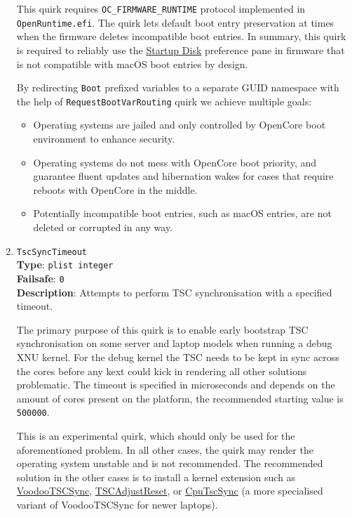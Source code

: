 \documentclass[]{article}
\providecommand{\tightlist}{%
  \setlength{\itemsep}{0pt}\setlength{\parskip}{0pt}}
\begin{document}
\begin{enumerate}
  This quirk requires \texttt{OC\_FIRMWARE\_RUNTIME} protocol implemented
  in \texttt{OpenRuntime.efi}. The quirk lets default boot entry
  preservation at times when the firmware deletes incompatible boot entries.
  In summary, this quirk is required to reliably
  use the \href{https://support.apple.com/HT202796}{Startup Disk} preference
  pane in firmware that is not compatible with macOS boot entries by design.

  By redirecting \texttt{Boot} prefixed variables to a separate GUID namespace
  with the help of \texttt{RequestBootVarRouting} quirk we achieve multiple goals:
  \begin{itemize}
  \tightlist
  \item Operating systems are jailed and only controlled by OpenCore boot
  environment to enhance security.
  \item Operating systems do not mess with OpenCore boot priority, and guarantee
  fluent updates and hibernation wakes for cases that require reboots with OpenCore
  in the middle.
  \item Potentially incompatible boot entries, such as macOS entries, are not deleted
  or corrupted in any way.
  \end{itemize}

\item
  \texttt{TscSyncTimeout}\\
  \textbf{Type}: \texttt{plist\ integer}\\
  \textbf{Failsafe}: \texttt{0}\\
  \textbf{Description}: Attempts to perform TSC synchronisation with a specified timeout.

  The primary purpose of this quirk is to enable early bootstrap TSC synchronisation
  on some server and laptop models when running a debug XNU kernel. For the debug kernel
  the TSC needs to be kept in sync across the cores before any kext could kick in rendering
  all other solutions problematic. The timeout is specified in microseconds and depends on the
  amount of cores present on the platform, the recommended starting value is \texttt{500000}.

  This is an experimental quirk, which should only be used for the aforementioned problem.
  In all other cases, the quirk may render the operating system unstable and is not recommended.
  The recommended solution in the other cases is to install a kernel extension such as
  \href{https://github.com/RehabMan/VoodooTSCSync}{VoodooTSCSync},
  \href{https://github.com/interferenc/TSCAdjustReset}{TSCAdjustReset},
  or \href{https://github.com/lvs1974/CpuTscSync}{CpuTscSync} (a more specialised
  variant of VoodooTSCSync for newer laptops).


\end{enumerate}
\end{document}
